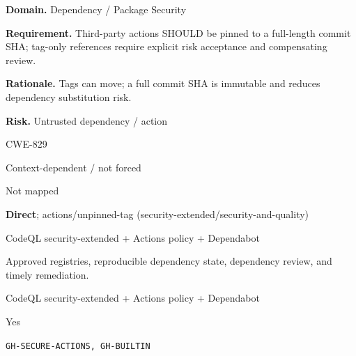 \documentclass[10pt,letterpaper]{article}
\newcommand{\prioritybadge}[2]{\tcbox[on line,boxrule=0pt,arc=1.2mm,boxsep=0.7mm,left=1mm,right=1mm,top=0.4mm,bottom=0.4mm,colback=#2!12,coltext=#2]{\scriptsize\bfseries #1}}
\begin{document}
\begin{rulebox}[title={\texttt{SCS-ACTIONS-DEP-001} \hfill \prioritybadge{Critical Control}{Critical}}]
\textbf{Domain.} Dependency / Package Security

\textbf{Requirement.} Third-party actions SHOULD be pinned to a full-length commit SHA; tag-only references require explicit risk acceptance and compensating review.

\textbf{Rationale.} Tags can move; a full commit SHA is immutable and reduces dependency substitution risk.

\textbf{Risk.} Untrusted dependency / action

\begin{description}[leftmargin=2.65cm,labelwidth=2.3cm,style=nextline,itemsep=1pt,topsep=3pt]
  \item[CWE] CWE-829
  \item[OWASP] Context-dependent / not forced
  \item[CERT] Not mapped
  \item[CodeQL] \textbf{Direct}; actions/unpinned-tag (security-extended/security-and-quality)
  \item[Enforcement] CodeQL security-extended + Actions policy + Dependabot
  \item[Prevention] Approved registries, reproducible dependency state, dependency review, and timely remediation.
  \item[Verification] CodeQL security-extended + Actions policy + Dependabot
  \item[Automation] Yes
  \item[Sources] \texttt{GH-SECURE-ACTIONS, GH-BUILTIN}
\end{description}
\end{rulebox}
\end{document}
